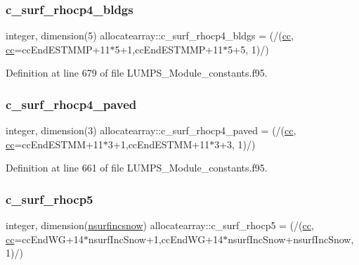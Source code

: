 \subsubsection{\texorpdfstring{c\+\_\+surf\+\_\+rhocp4\+\_\+bldgs}{c\_surf\_rhocp4\_bldgs}}
{\footnotesize\ttfamily integer, dimension(5) allocatearray\+::c\+\_\+surf\+\_\+rhocp4\+\_\+bldgs = (/(\hyperlink{namespaceallocatearray_ac863c81704eb507dee10f5e10741e10c}{cc}, \hyperlink{namespaceallocatearray_ac863c81704eb507dee10f5e10741e10c}{cc}=cc\+End\+E\+S\+T\+M\+MP+11$\ast$5+1,cc\+End\+E\+S\+T\+M\+MP+11$\ast$5+5, 1)/)}



Definition at line 679 of file L\+U\+M\+P\+S\+\_\+\+Module\+\_\+constants.\+f95.

\mbox{\label{namespaceallocatearray_a77b35184224cfedd443821142679b770}} 
\subsubsection{\texorpdfstring{c\+\_\+surf\+\_\+rhocp4\+\_\+paved}{c\_surf\_rhocp4\_paved}}
{\footnotesize\ttfamily integer, dimension(3) allocatearray\+::c\+\_\+surf\+\_\+rhocp4\+\_\+paved = (/(\hyperlink{namespaceallocatearray_ac863c81704eb507dee10f5e10741e10c}{cc}, \hyperlink{namespaceallocatearray_ac863c81704eb507dee10f5e10741e10c}{cc}=cc\+End\+E\+S\+T\+MM+11$\ast$3+1,cc\+End\+E\+S\+T\+MM+11$\ast$3+3, 1)/)}



Definition at line 661 of file L\+U\+M\+P\+S\+\_\+\+Module\+\_\+constants.\+f95.

\mbox{\label{namespaceallocatearray_aca21486cca8b4e96b0e6015c03f7a2dc}} 
\subsubsection{\texorpdfstring{c\+\_\+surf\+\_\+rhocp5}{c\_surf\_rhocp5}}
{\footnotesize\ttfamily integer, dimension(\hyperlink{namespaceallocatearray_af4d113f332b6759cfa22271140c9162d}{nsurfincsnow}) allocatearray\+::c\+\_\+surf\+\_\+rhocp5 = (/(\hyperlink{namespaceallocatearray_ac863c81704eb507dee10f5e10741e10c}{cc}, \hyperlink{namespaceallocatearray_ac863c81704eb507dee10f5e10741e10c}{cc}=cc\+End\+WG+14$\ast$nsurf\+Inc\+Snow+1,cc\+End\+WG+14$\ast$nsurf\+Inc\+Snow+nsurf\+Inc\+Snow, 1)/)}



